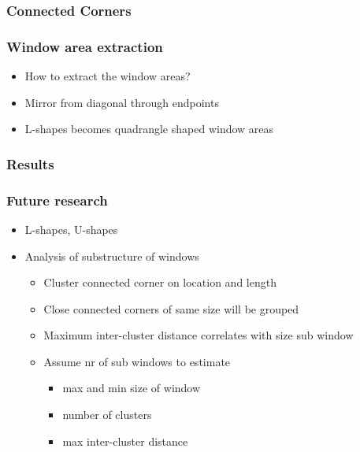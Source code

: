 \documentclass{beamer}
\begin{document}
\frame
{
}

\frame
{
	\frametitle{Connected Corners}

}

\frame
{
	\frametitle{Window area extraction}
	\begin{itemize}
	\item <+-| alert@+> How to extract the window areas?
	\item <+-| alert@+> Mirror from diagonal through endpoints
	\item <+-| alert@+> L-shapes becomes quadrangle shaped window areas
	\end{itemize}
}

\frame
{
	\frametitle{Results}
}

\frame
{
	\frametitle{Future research}
	\begin{itemize}
	\item <+-| alert@+> L-shapes, U-shapes
	\item <+-| alert@+> Analysis of substructure of windows
	\begin{itemize}
		\item <+-| alert@+> Cluster connected corner on location and length
		\item <+-| alert@+> Close connected corners of same size will be grouped
		\item <+-| alert@+> Maximum inter-cluster distance correlates with size sub window
		\item <+-| alert@+> Assume nr of sub windows to estimate 
		\begin{itemize}
			\item max and min size of window
			\item number of clusters
			\item max inter-cluster distance
		\end{itemize}
	\end{itemize}
	\end{itemize}
}
\end{document}
